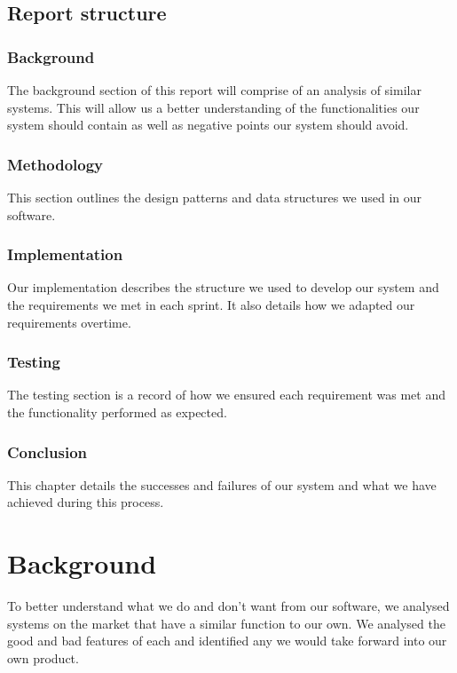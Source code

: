 \documentclass[a4paper, oneside, 11pt]{report}
\begin{document}
\section{Report structure}

\subsection {Background}

The background section of this report will comprise of an analysis of similar systems. This will allow us a better understanding of the functionalities our system should contain as well as negative points our system should avoid.

\subsection {Methodology}

This section outlines the design patterns and data structures we used in our software.

\subsection {Implementation}

Our implementation describes the structure we used to develop our system and the requirements we met in each sprint. It also details how we adapted our requirements overtime.

\subsection {Testing}

The testing section is a record of how we ensured each requirement was met and the functionality performed as expected.

\subsection {Conclusion}

This chapter details the successes and failures of our system and what we have achieved during this process.

\chapter{Background}

To better understand what we do and don't want from our software, we analysed systems on the market that have a similar function to our own. We analysed the good and bad features of each and identified any we would take forward into our own product.
\end{document}
